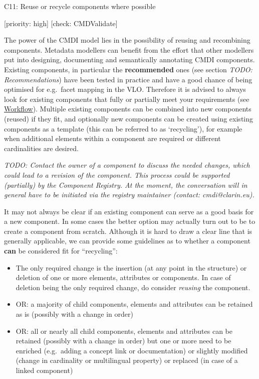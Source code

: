 \documentclass[]{article}
\providecommand{\tightlist}{%
  \setlength{\itemsep}{0pt}\setlength{\parskip}{0pt}}
\begin{document}
C11: Reuse or recycle components where possible

{[}priority: high{]} {[}check: CMDValidate{]}

The power of the CMDI model lies in the possibility of reusing and
recombining components. Metadata modellers can benefit from the effort
that other modellers put into designing, documenting and semantically
annotating CMDI components. Existing components, in particular the
\textbf{recommended} ones (see section \emph{TODO: Recommendations})
have been tested in practice and have a good chance of being optimised
for e.g.~facet mapping in the VLO. Therefore it is advised to always
look for existing components that fully or partially meet your
requirements (see \href{./workflow.md}{Workflow}). Multiple existing
components can be combined into new components (reused) if they fit, and
optionally new components can be created using existing components as a
template (this can be referred to as `recycling'), for example when
additional elements within a component are required or different
cardinalities are desired.

\emph{TODO: Contact the owner of a component to discuss the needed
changes, which could lead to a revision of the component. This process
could be supported (partially) by the Component Registry. At the moment,
the conversation will in general have to be initiated via the registry
maintainer (contact: cmdi@clarin.eu).}

It may not always be clear if an existing component can serve as a good
basis for a new component. In some cases the better option may actually
turn out to be to create a component from scratch. Although it is hard
to draw a clear line that is generally applicable, we can provide some
guidelines as to whether a component \textbf{can} be considered fit for
``recycling'':

\begin{itemize}
\tightlist
\item
  The only required change is the insertion (at any point in the
  structure) or deletion of one or more elements, attributes or
  components. In case of deletion being the only required change, do
  consider \emph{reusing} the component.
\item
  OR: a majority of child components, elements and attributes can be
  retained as is (possibly with a change in order)
\item
  OR: all or nearly all child components, elements and attributes can be
  retained (possibly with a change in order) but one or more need to be
  enriched (e.g.~adding a concept link or documentation) or slightly
  modified (change in cardinality or multilingual property) or replaced
  (in case of a linked component)
\end{itemize}
\end{document}
